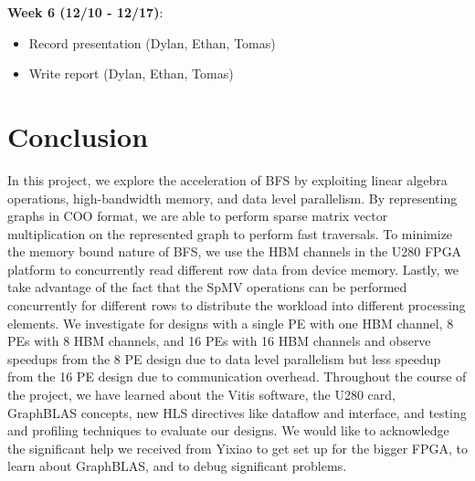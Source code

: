 \documentclass[10pt]{article}
\begin{document}
\noindent \textbf{Week 6 (12/10 - 12/17)}:
\begin{itemize}
  \item Record presentation (Dylan, Ethan, Tomas)
  \item Write report (Dylan, Ethan, Tomas)
\end{itemize}

\section{Conclusion}

\noindent In this project, we explore the acceleration of BFS by exploiting linear algebra 
operations, high-bandwidth memory, and data level parallelism. By representing graphs in
COO format, we are able to perform sparse matrix vector multiplication on the represented graph
to perform fast traversals. To minimize the memory bound nature of BFS, we use the HBM 
channels in the U280 FPGA platform to concurrently read different row data from device memory.
Lastly, we take advantage of the fact that the SpMV operations can be performed concurrently for 
different rows to distribute the workload into different processing elements. We investigate
for designs with a single PE with one HBM channel, 8 PEs with 8 HBM channels, and 16 PEs with 16 HBM
channels and observe speedups from the 8 PE design due to data level parallelism but 
less speedup from the 16 PE design due to communication overhead. Throughout the course of the 
project, we have learned about the Vitis software, the U280 card, GraphBLAS concepts, new HLS directives
like dataflow and interface, and testing and profiling techniques to evaluate our designs. We would
like to acknowledge the significant help we received from Yixiao to get set up for the bigger FPGA, 
to learn about GraphBLAS, and to debug significant problems. 
\end{document}
